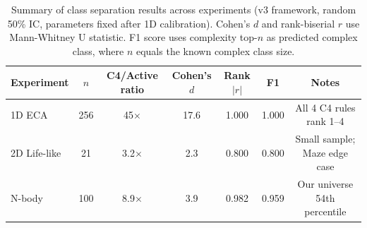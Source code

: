 \documentclass[12pt,a4paper]{article}
\begin{document}
\begin{table}[h]
\centering
\caption{%
  Summary of class separation results across experiments (v3 framework,
  random 50\% IC, parameters fixed after 1D calibration).
  Cohen's $d$ and rank-biserial $r$ use Mann-Whitney U statistic.
  F1 score uses complexity top-$n$ as predicted complex class,
  where $n$ equals the known complex class size.
}
\begin{tabular}{lcccccc}
\toprule
Experiment & $n$ & C4/Active ratio & Cohen's $d$ & Rank $|r|$ & F1 & Notes \\
\midrule
1D ECA      & 256  & 45$\times$  & 17.6 & 1.000 & 1.000 & All 4 C4 rules rank 1--4 \\
2D Life-like & 21  & 3.2$\times$ & 2.3  & 0.800 & 0.800 & Small sample; Maze edge case \\
N-body      & 100  & 8.9$\times$ & 3.9  & 0.982 & 0.959 & Our universe 54th percentile \\
\bottomrule
\end{tabular}
\end{table}

\end{document}
